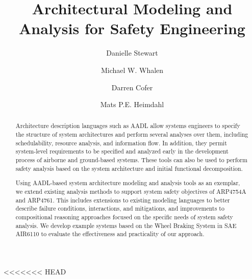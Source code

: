 \documentclass{llncs}
\begin{document}
\newcommand{\stateequiv}{\equiv_{s}}
\newcommand{\traceequiv}{\equiv_{\sigma}}
\newcommand{\ta}{\text{TA}}
\newcommand{\cta}{\text{TA$_{C}$}}
\newcommand{\tta}{\text{TA$_{T}$}}
\newcommand{\ucalg}{\texttt{\small{IVC\_UC}}}
\newcommand{\ucbfalg}{\texttt{\small{IVC\_UCBF}}}


\title{Architectural Modeling and Analysis for Safety Engineering}
%
<<<<<<< HEAD
\author{Danielle Stewart
\and Michael W. Whalen
\and Darren Cofer
\and Mats P.E. Heimdahl }
\maketitle

\begin{abstract}
Architecture description languages such as AADL allow systems engineers to specify the structure of system architectures and perform several analyses over them, including schedulability, resource analysis, and information flow.  In addition, they
permit system-level requirements to be specified and analyzed early in the development process of airborne and ground-based systems. These tools can also be used to perform safety analysis based on the system architecture and initial functional decomposition.


Using AADL-based system architecture modeling and analysis tools as an exemplar, we extend existing analysis methods to support system safety objectives of ARP4754A and ARP4761. This includes extensions to existing modeling languages to better describe failure conditions, interactions, and mitigations, and improvements to compositional reasoning approaches focused on the specific needs of system safety analysis. We develop example systems based on the Wheel Braking System in SAE AIR6110 to evaluate the effectiveness and practicality of our approach.
\end{abstract}
\end{document}
